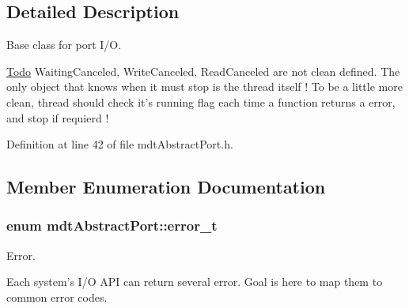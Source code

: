 \subsection{Detailed Description}
Base class for port I/O. 

\begin{Desc}
\item[\hyperlink{todo__todo000013}{Todo}]WaitingCanceled, WriteCanceled, ReadCanceled are not clean defined. The only object that knows when it must stop is the thread itself ! To be a little more clean, thread should check it's running flag each time a function returns a error, and stop if requierd ! \end{Desc}


Definition at line 42 of file mdtAbstractPort.h.



\subsection{Member Enumeration Documentation}
\hypertarget{classmdt_abstract_port_ad4121bb930c95887e77f8bafa065a85e}{
\subsubsection[{error\_\-t}]{\setlength{\rightskip}{0pt plus 5cm}enum {\bf mdtAbstractPort::error\_\-t}}}
\label{classmdt_abstract_port_ad4121bb930c95887e77f8bafa065a85e}


Error. 

Each system's I/O API can return several error. Goal is here to map them to common error codes.

